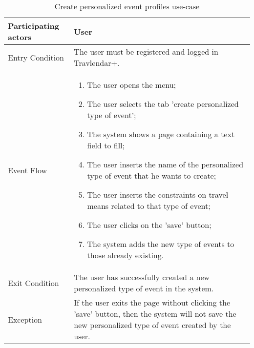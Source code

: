 \begin{table}[H]
	\begin{center}
		\begin{tabular}{ | p{} | p{} | }
		\hline
		Participating actors & User\\
		\hline
		Entry Condition & The user must be registered and logged in Travlendar+.\\
		\hline
		Event Flow & 
			\begin{enumerate}
				\item The user opens the menu;
				\item The user selects the tab 'create personalized type of event';
				\item The system shows a page containing a text field to fill;
				\item The user inserts the name of the personalized type of event that he wants to create;
				\item The user inserts the constraints on travel means related to that type of event;
				\item The user clicks on the 'save' button;
				\item The system adds the new type of events to those already existing.

			\end{enumerate} \\
		\hline
		Exit Condition & The user has successfully created a new personalized type of event in the system.\\
		\hline
		Exception & If the user exits the page without clicking the 'save' button, then the system will not save the new personalized type of event created by the user.\\ 
		\hline
		\end{tabular}
	\end{center}
	\caption{Create personalized event profiles use-case}
\end{table}